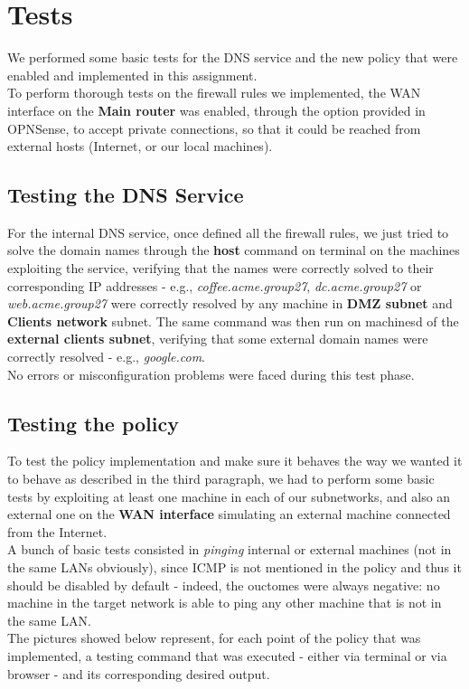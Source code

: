 \section{Tests}
We performed some basic tests for the DNS service and the new policy that were enabled and implemented in this assignment.\\
To perform thorough tests on the firewall rules we implemented, the WAN interface on the \textbf{Main router} was enabled, through the option provided in OPNSense, to accept private connections, so that it could be reached from external hosts (Internet, or our local machines).\\

\subsection{Testing the DNS Service}
For the internal DNS service, once defined all the firewall rules, we just tried to solve the domain names through the \textbf{host} command on terminal on the machines exploiting the service, verifying that the names were correctly solved to their corresponding IP addresses - e.g., \textit{coffee.acme.group27}, \textit{dc.acme.group27} or \textit{web.acme.group27} were correctly resolved by any machine in \textbf{DMZ subnet} and \textbf{Clients network} subnet. The same command was then run on machinesd of the \textbf{external clients subnet}, verifying that some external domain names were correctly resolved - e.g., \textit{google.com}.\\
No errors or misconfiguration problems were faced during this test phase.

\subsection{Testing the policy}
To test the policy implementation and make sure it behaves the way we wanted it to behave as described in the third paragraph, we had to perform some basic tests by exploiting at least one machine in each of our subnetworks, and also an external one on the \textbf{WAN interface} simulating an external machine connected from the Internet.\\
A bunch of basic tests consisted in \textit{pinging} internal or external machines (not in the same LANs obviously), since ICMP is not mentioned in the policy and thus it should be disabled by default - indeed, the ouctomes were always negative: no machine in the target network is able to ping any other machine that is not in the same LAN.\\
The pictures showed below represent, for each point of the policy that was implemented, a testing command that was executed - either via terminal or via browser - and its corresponding desired output.\\

